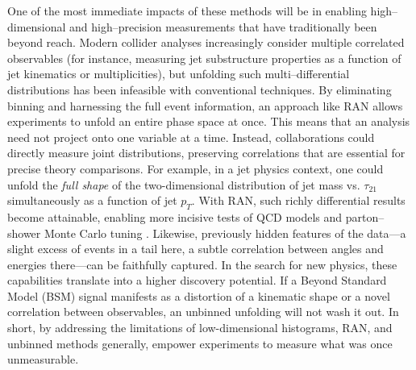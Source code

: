         One of the most immediate impacts of these methods will be in enabling {high--dimensional and high--precision measurements} that have traditionally been beyond reach.
        Modern collider analyses increasingly consider multiple correlated observables (for instance, measuring jet substructure properties as a function of jet kinematics or multiplicities), but unfolding such multi--differential distributions has been infeasible with conventional techniques.
        By eliminating binning and harnessing the full event information, an approach like RAN allows experiments to unfold an entire phase space at once.
        This means that an analysis need not project onto one variable at a time.
        Instead, collaborations could directly measure joint distributions, preserving correlations that are essential for precise theory comparisons.
        For example, in a jet physics context, one could unfold the \emph{full shape} of the two-dimensional distribution of jet mass vs. $\tau_{21}$ simultaneously as a function of jet $p_T$.
        With RAN, such richly differential results become attainable, enabling more incisive tests of QCD models and parton--shower Monte Carlo tuning .
        Likewise, previously hidden features of the data---a slight excess of events in a tail here, a subtle correlation between angles and energies there---can be faithfully captured.
        In the search for new physics, these capabilities translate into a higher discovery potential.
        If a Beyond Standard Model (BSM) signal manifests as a distortion of a kinematic shape or a novel correlation between observables, an unbinned unfolding will not wash it out.
        In short, by addressing the limitations of low-dimensional histograms, RAN, and unbinned methods generally, empower experiments to measure what was once unmeasurable.
    
